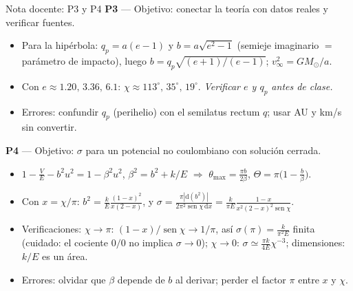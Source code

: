 \documentclass[aspectratio=169]{beamer}
\providecommand{\sen}{}
\renewcommand{\sen}{\operatorname{sen}}
\newcommand{\tmax}{\theta_{\max}}
\newcommand{\dd}{\mathrm{d}}
\begin{document}
\begin{frame}{Nota docente: P3 y P4}
\footnotesize
\textbf{P3} — Objetivo: conectar la teoría con datos reales y verificar fuentes.
\begin{itemize}
  \item Para la hipérbola: $q_p=a(e-1)$ y $b=a\sqrt{e^2-1}$ (semieje imaginario $=$ parámetro
        de impacto), luego $b=q_p\sqrt{(e+1)/(e-1)}$; $v_\infty^2=GM_\odot/a$.
  \item Con $e\approx1.20,\,3.36,\,6.1$: $\chi\approx113^\circ,\,35^\circ,\,19^\circ$.
        \emph{Verificar $e$ y $q_p$ antes de clase.}
  \item Errores: confundir $q_p$ (perihelio) con el semilatus rectum $q$; usar AU y km/s sin convertir.
\end{itemize}
\textbf{P4} — Objetivo: $\sigma$ para un potencial no coulombiano con solución cerrada.
\begin{itemize}
  \item $1-\frac{V}{E}-b^2u^2=1-\beta^2u^2$, $\beta^2=b^2+k/E$ $\Rightarrow$
        $\tmax=\frac{\pi b}{2\beta}$, \; $\Theta=\pi\big(1-\frac{b}{\beta}\big)$.
  \item Con $x=\chi/\pi$: $b^2=\frac kE\frac{(1-x)^2}{x(2-x)}$, y
        $\sigma=\frac{\pi|\dd(b^2)|}{2\pi^2\sen\chi\,\dd x}
        =\frac{k}{\pi E}\frac{1-x}{x^2(2-x)^2\sen\chi}$.
  \item Verificaciones: $\chi\to\pi$: $(1-x)/\sen\chi\to1/\pi$, así $\sigma(\pi)=\frac{k}{\pi^2E}$ finita
        (cuidado: el cociente $0/0$ no implica $\sigma\to0$); $\chi\to0$:
        $\sigma\simeq\frac{\pi k}{4E}\chi^{-3}$; dimensiones: $k/E$ es un área. \checkmark
  \item Errores: olvidar que $\beta$ depende de $b$ al derivar; perder el factor $\pi$ entre $x$ y $\chi$.
\end{itemize}
\end{frame}
\end{document}
